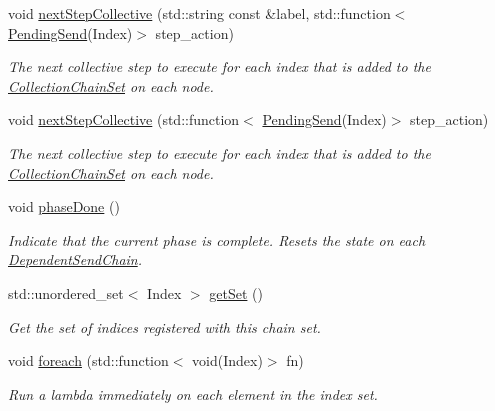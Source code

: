 \begin{DoxyCompactItemize}
void \hyperlink{classvt_1_1messaging_1_1_collection_chain_set_a095bc4907c3bd60668483de52b79b08e}{next\+Step\+Collective} (std\+::string const \&label, std\+::function$<$ \hyperlink{structvt_1_1messaging_1_1_pending_send}{Pending\+Send}(Index)$>$ step\+\_\+action)
\begin{DoxyCompactList}\small\item\em The next collective step to execute for each index that is added to the \hyperlink{classvt_1_1messaging_1_1_collection_chain_set}{Collection\+Chain\+Set} on each node. \end{DoxyCompactList}\item 
void \hyperlink{classvt_1_1messaging_1_1_collection_chain_set_a7d226984e696278b9ca7e539c974bab4}{next\+Step\+Collective} (std\+::function$<$ \hyperlink{structvt_1_1messaging_1_1_pending_send}{Pending\+Send}(Index)$>$ step\+\_\+action)
\begin{DoxyCompactList}\small\item\em The next collective step to execute for each index that is added to the \hyperlink{classvt_1_1messaging_1_1_collection_chain_set}{Collection\+Chain\+Set} on each node. \end{DoxyCompactList}\item 
void \hyperlink{classvt_1_1messaging_1_1_collection_chain_set_afcb749b22063068d060f35fdcd2320b3}{phase\+Done} ()
\begin{DoxyCompactList}\small\item\em Indicate that the current phase is complete. Resets the state on each {\ttfamily \hyperlink{classvt_1_1messaging_1_1_dependent_send_chain}{Dependent\+Send\+Chain}}. \end{DoxyCompactList}\item 
std\+::unordered\+\_\+set$<$ Index $>$ \hyperlink{classvt_1_1messaging_1_1_collection_chain_set_a17bcba0392b2ae7c68a3c3630b71ffa3}{get\+Set} ()
\begin{DoxyCompactList}\small\item\em Get the set of indices registered with this chain set. \end{DoxyCompactList}\item 
void \hyperlink{classvt_1_1messaging_1_1_collection_chain_set_a5768b5b636799860a63ab182a1e34c9a}{foreach} (std\+::function$<$ void(Index)$>$ fn)
\begin{DoxyCompactList}\small\item\em Run a lambda immediately on each element in the index set. \end{DoxyCompactList}\end{DoxyCompactItemize}
